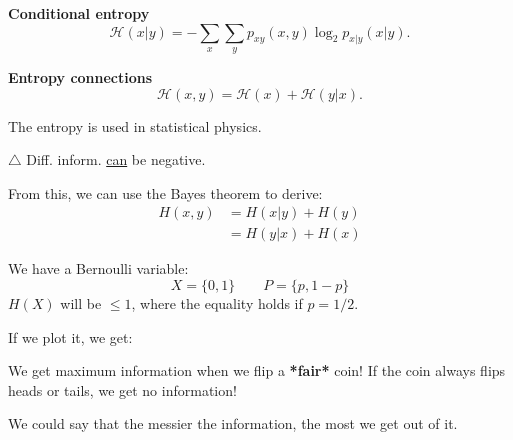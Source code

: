 \documentclass[a4paper, 12pt]{book}
\begin{document}
\textbf{Conditional entropy}
\begin{equation*}
    \mathcal{H}(x|y) = -\sum_{x}\sum_{y} p_{xy}(x,y) \log_2 p_{x|y}(x|y).
\end{equation*}

\textbf{Entropy connections}
\begin{equation*}
    \mathcal{H}(x,y) = \mathcal{H}(x) + \mathcal{H}(y|x).
\end{equation*}

The entropy is used in statistical physics.

\begin{purplebox}
    $\triangle$ Diff. inform. \underline{can} be negative.
\end{purplebox}

From this, we can use the Bayes theorem to derive:
\begin{align*}
    H(x,y) &= H(x|y) + H(y) \\
           &= H(y|x) + H(x)
\end{align*}

\begin{example}
    We have a Bernoulli variable:
    \[ X = \{ 0, 1 \} \qquad P = \{ p, 1-p \} \]
    $H(X)$ will be $\leq 1$, where the equality holds if $p=1/2$.
    
    If we plot it, we get:
    \begin{center}
    \end{center}
    
    We get maximum information when we flip a \textbf{*fair*} coin!
    If the coin always flips heads or tails, we get no information!
\end{example}

We could say that the messier the information, the most we get out of it.
\end{document}
